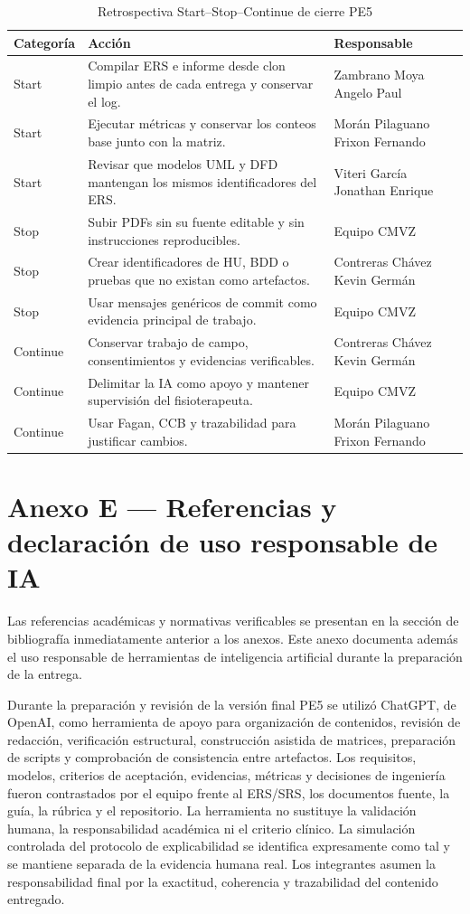 \documentclass[12pt,a4paper]{article}
\begin{document}
\begin{table}[H]\centering\caption{Retrospectiva Start--Stop--Continue de cierre PE5}
\begin{tabularx}{\textwidth}{p{}X p{}}\toprule
\textbf{Categoría}&\textbf{Acción}&\textbf{Responsable}\\\midrule
Start&Compilar ERS e informe desde clon limpio antes de cada entrega y conservar el log.&Zambrano Moya Angelo Paul\\
Start&Ejecutar métricas y conservar los conteos base junto con la matriz.&Morán Pilaguano Frixon Fernando\\
Start&Revisar que modelos UML y DFD mantengan los mismos identificadores del ERS.&Viteri García Jonathan Enrique\\
Stop&Subir PDFs sin su fuente editable y sin instrucciones reproducibles.&Equipo CMVZ\\
Stop&Crear identificadores de HU, BDD o pruebas que no existan como artefactos.&Contreras Chávez Kevin Germán\\
Stop&Usar mensajes genéricos de commit como evidencia principal de trabajo.&Equipo CMVZ\\
Continue&Conservar trabajo de campo, consentimientos y evidencias verificables.&Contreras Chávez Kevin Germán\\
Continue&Delimitar la IA como apoyo y mantener supervisión del fisioterapeuta.&Equipo CMVZ\\
Continue&Usar Fagan, CCB y trazabilidad para justificar cambios.&Morán Pilaguano Frixon Fernando\\
\bottomrule
\end{tabularx}
\end{table}
\clearpage

\section*{Anexo E — Referencias y declaración de uso responsable de IA}
Las referencias académicas y normativas verificables se presentan en la sección de bibliografía inmediatamente anterior a los anexos. Este anexo documenta además el uso responsable de herramientas de inteligencia artificial durante la preparación de la entrega.


Durante la preparación y revisión de la versión final PE5 se utilizó ChatGPT, de OpenAI, como herramienta de apoyo para organización de contenidos, revisión de redacción, verificación estructural, construcción asistida de matrices, preparación de scripts y comprobación de consistencia entre artefactos. Los requisitos, modelos, criterios de aceptación, evidencias, métricas y decisiones de ingeniería fueron contrastados por el equipo frente al ERS/SRS, los documentos fuente, la guía, la rúbrica y el repositorio. La herramienta no sustituye la validación humana, la responsabilidad académica ni el criterio clínico. La simulación controlada del protocolo de explicabilidad se identifica expresamente como tal y se mantiene separada de la evidencia humana real. Los integrantes asumen la responsabilidad final por la exactitud, coherencia y trazabilidad del contenido entregado.
\clearpage
\end{document}
